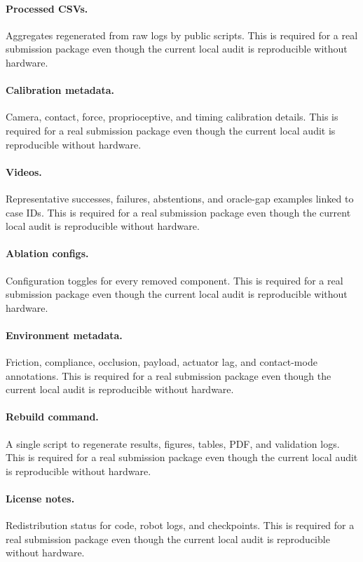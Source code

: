 \documentclass{article}
\begin{document}
\paragraph{Processed CSVs.} Aggregates regenerated from raw logs by public scripts. This is required for a real submission package even though the current local audit is reproducible without hardware.
\paragraph{Calibration metadata.} Camera, contact, force, proprioceptive, and timing calibration details. This is required for a real submission package even though the current local audit is reproducible without hardware.
\paragraph{Videos.} Representative successes, failures, abstentions, and oracle-gap examples linked to case IDs. This is required for a real submission package even though the current local audit is reproducible without hardware.
\paragraph{Ablation configs.} Configuration toggles for every removed component. This is required for a real submission package even though the current local audit is reproducible without hardware.
\paragraph{Environment metadata.} Friction, compliance, occlusion, payload, actuator lag, and contact-mode annotations. This is required for a real submission package even though the current local audit is reproducible without hardware.
\paragraph{Rebuild command.} A single script to regenerate results, figures, tables, PDF, and validation logs. This is required for a real submission package even though the current local audit is reproducible without hardware.
\paragraph{License notes.} Redistribution status for code, robot logs, and checkpoints. This is required for a real submission package even though the current local audit is reproducible without hardware.
\begingroup
\raggedright


\endgroup
\end{document}
